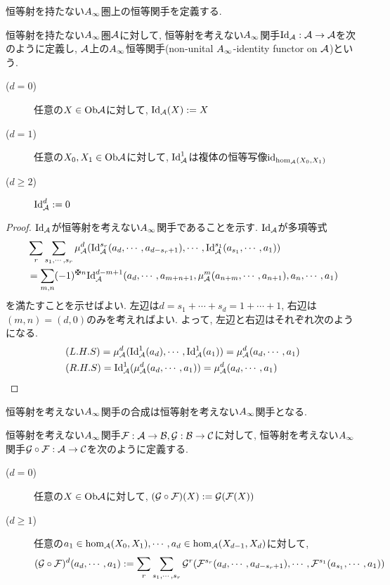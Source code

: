 \documentclass[uplatex, a4paper, 14Q, dvipdfmx]{jsarticle}
\begin{document}
恒等射を持たない$A_{\infty}$圏上の恒等関手を定義する. 

\begin{definition} \label{def_identity__Ainf_func}
  恒等射を持たない$A_{\infty}$圏$\mathcal{A}$に対して, 恒等射を考えない$A_{\infty}$関手$\mathrm{Id}_{\mathcal{A}} : \mathcal{A} \to \mathcal{A}$を次のように定義し, $\mathcal{A}$上の$A_{\infty}$恒等関手(non-unital $A_{\infty}$-identity functor on $\mathcal{A}$)という.
  \begin{description}
    \item[($d=0$)] 任意の$X \in \mathrm{Ob}\mathcal{A}$に対して, $\mathrm{Id}_{\mathcal{A}}(X) := X$
    \item[($d=1$)] 任意の$X_0,X_1 \in \mathrm{Ob}\mathcal{A}$に対して, $\mathrm{Id}_{\mathcal{A}}^1$は複体の恒等写像$\mathrm{id}_{\hom_{\mathcal{A}}(X_0,X_1)}$
    \item[($d \geq 2$)] $\mathrm{Id}_{\mathcal{A}}^d := 0$
  \end{description}
\end{definition}

\begin{proof}
  $\mathrm{Id}_{\mathcal{A}}$が恒等射を考えない$A_{\infty}$関手であることを示す. 
  $\mathrm{Id}_{\mathcal{A}}$が多項等式
  \begin{align*}
    &\sum_r \sum_{s_1,\cdots,s_r} \mu^d_\A (\Id_\A^{s_r} (a_d,\cdots,a_{d-s_r+1}), \cdots, \Id_\A^{s_1}(a_{s_1},\cdots,a_1)) \\ 
    &= \sum_{m,n} (-1)^{\maltese n} \Id_\A^{d-m+1} (a_d,\cdots,a_{m+n+1}, \mu^m_\A(a_{n+m},\cdots,a_{n+1}), a_n,\cdots,a_1)
  \end{align*}
  を満たすことを示せばよい.
  左辺は$d = s_1+\cdots+s_d = 1+\cdots+1$, 右辺は$(m,n)=(d,0)$のみを考えればよい. 
  よって, 左辺と右辺はそれぞれ次のようになる. 
  \begin{align*}
    &(L.H.S) 
    = \mu^d_{\mathcal{A}}(\mathrm{Id}_{\mathcal{A}}^1(a_d), \cdots, \mathrm{Id}_{\mathcal{A}}^1(a_1)) 
    = \mu^d_{\mathcal{A}}(a_d, \cdots, a_1) \\
    &(R.H.S)
    = \mathrm{Id}_{\mathcal{A}}^1(\mu^d_{\mathcal{A}}(a_d, \cdots, a_1)) 
    = \mu^d_{\mathcal{A}}(a_d, \cdots, a_1)
  \end{align*}
\end{proof}

恒等射を考えない$A_{\infty}$関手の合成は恒等射を考えない$A_{\infty}$関手となる. 

\begin{definition} \label{def_comp_of_Ainf_func}
  恒等射を考えない$A_{\infty}$関手$\mathcal{F} : \mathcal{A} \to \mathcal{B}, \mathcal{G} : \mathcal{B} \to \mathcal{C}$に対して, 恒等射を考えない$A_{\infty}$関手$\mathcal{G} \circ \mathcal{F} : \mathcal{A} \to \mathcal{C}$を次のように定義する. 
  \begin{description}
    \item[($d=0$)] 任意の$X \in \mathrm{Ob}\mathcal{A}$に対して, $(\mathcal{G} \circ \mathcal{F})(X) : = \mathcal{G}(\mathcal{F}(X))$
    \item[($d \geq 1$)] 任意の$a_1 \in \hom_{\mathcal{A}}(X_0,X_1), \cdots, a_d \in \hom_{\mathcal{A}}(X_{d-1},X_d)$に対して,
    \begin{align*}
      (\mathcal{G} \circ \mathcal{F})^d (a_d,\cdots,a_1)
      := \sum_r \sum_{s_1,\cdots,s_r} \mathcal{G}^r(\mathcal{F}^{s_r} (a_d,\cdots,a_{d-s_r+1}), \cdots, \mathcal{F}^{s_1}(a_{s_1},\cdots,a_1))
    \end{align*}
  \end{description}
\end{definition}
\end{document}
